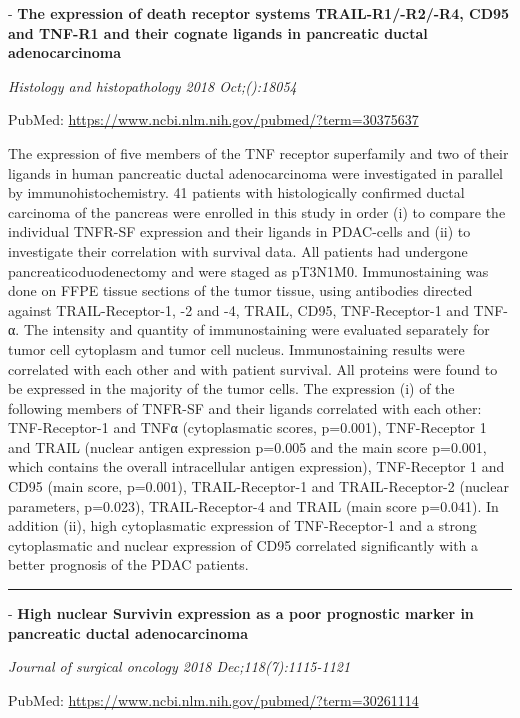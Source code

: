 \documentclass[]{article}
\begin{document}
 - \textbf{The expression of death receptor systems TRAIL-R1/-R2/-R4,
CD95 and TNF-R1 and their cognate ligands in pancreatic ductal
adenocarcinoma}

\emph{Histology and histopathology 2018 Oct;():18054}

PubMed: \url{https://www.ncbi.nlm.nih.gov/pubmed/?term=30375637}

The expression of five members of the TNF receptor superfamily and two
of their ligands in human pancreatic ductal adenocarcinoma were
investigated in parallel by immunohistochemistry. 41 patients with
histologically confirmed ductal carcinoma of the pancreas were enrolled
in this study in order (i) to compare the individual TNFR-SF expression
and their ligands in PDAC-cells and (ii) to investigate their
correlation with survival data. All patients had undergone
pancreaticoduodenectomy and were staged as pT3N1M0. Immunostaining was
done on FFPE tissue sections of the tumor tissue, using antibodies
directed against TRAIL-Receptor-1, -2 and -4, TRAIL, CD95,
TNF-Receptor-1 and TNF-α. The intensity and quantity of immunostaining
were evaluated separately for tumor cell cytoplasm and tumor cell
nucleus. Immunostaining results were correlated with each other and with
patient survival. All proteins were found to be expressed in the
majority of the tumor cells. The expression (i) of the following members
of TNFR-SF and their ligands correlated with each other: TNF-Receptor-1
and TNFα (cytoplasmatic scores, p=0.001), TNF-Receptor 1 and TRAIL
(nuclear antigen expression p=0.005 and the main score p=0.001, which
contains the overall intracellular antigen expression), TNF-Receptor 1
and CD95 (main score, p=0.001), TRAIL-Receptor-1 and TRAIL-Receptor-2
(nuclear parameters, p=0.023), TRAIL-Receptor-4 and TRAIL (main score
p=0.041). In addition (ii), high cytoplasmatic expression of
TNF-Receptor-1 and a strong cytoplasmatic and nuclear expression of CD95
correlated significantly with a better prognosis of the PDAC patients.

{}

{}

\begin{center}\rule{0.5\linewidth}{\linethickness}\end{center}

 - \textbf{High nuclear Survivin expression as a poor prognostic marker
in pancreatic ductal adenocarcinoma}

\emph{Journal of surgical oncology 2018 Dec;118(7):1115-1121}

PubMed: \url{https://www.ncbi.nlm.nih.gov/pubmed/?term=30261114}
\end{document}
